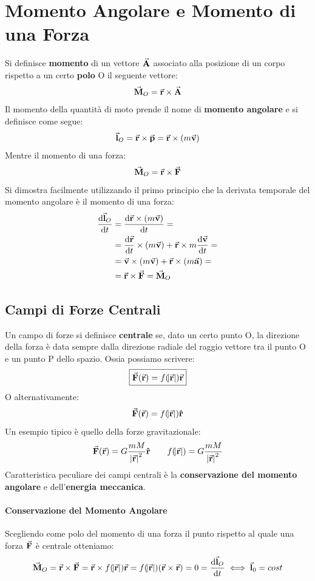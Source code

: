 \documentclass{report}
\renewcommand{\a}{\va{a}}
\renewcommand{\v}{\va{v}}
\renewcommand{\r}{\va{r}}
\newcommand{\F}{\va{F}}
\newcommand{\M}{\va{M}}
\renewcommand{\l}{\va{l}}
\newcommand{\p}{\va{p}}
\newcommand{\A}{\va{A}}
\begin{document}
\section{Momento Angolare e Momento di una Forza}
Si definisce \textbf{momento} di un vettore $\A$ associato alla posizione di un corpo rispetto a un certo \textbf{polo} O il seguente vettore:
\begin{equation}
    \M_O=\r\times\A
\end{equation}
Il momento della quantità di moto prende il nome di \textbf{momento angolare} e si definisce come segue:
\begin{equation}
    \l_{O}=\r\times\p=\r\times(m\v)
\end{equation}
Mentre il momento di una forza:
\begin{equation}
    \M_O=\r\times\F
\end{equation}
Si dimostra facilmente utilizzando il primo principio che la derivata temporale del momento angolare è il momento di una forza:
\begin{equation}
\begin{split}
    \dv{\l_O}{t}&=\dv{\r\times(m\v)}{t}=\\
    &=\dv{\r}{t}\times(m\v)+\r\times m\dv{\v}{t}=\\
    &=\v\times(m\v)+\r\times(m\a)=\\
    &=\r\times\F=\M_O
\end{split}
\end{equation}
\subsection{Campi di Forze Centrali}
Un campo di forze si definisce \textbf{centrale} se, dato un certo punto O, la direzione della forza è data sempre dalla direzione radiale del raggio vettore tra il punto O e un punto P dello spazio. Ossia possiamo scrivere:
\begin{equation}
    \boxed{\F(\r)=f(\abs{\r})\r}
\end{equation}
O alternativamente:
\[\F(\r)=f(\abs{\r})\vu{r}\]
Un esempio tipico è quello della forze gravitazionale:
\[\F(\r)=G\frac{mM}{\abs{\r}^2}\vu{r}\quad\quad f(\abs{\r})=G\frac{mM}{\abs{\r}^2}\]
Caratteristica peculiare dei campi centrali è la \textbf{conservazione del momento angolare} e dell'\textbf{energia meccanica}.
\paragraph{Conservazione del Momento Angolare}
Scegliendo come polo del momento di una forza il punto rispetto al quale una forza $\F$ è centrale otteniamo:
\[\M_O=\r\times\F=\r\times f(\abs{\r})\r=f(\abs{\r})(\r\times\r)=0=\dv{\l_O}{t}\iff\l_0=cost\]
\end{document}
